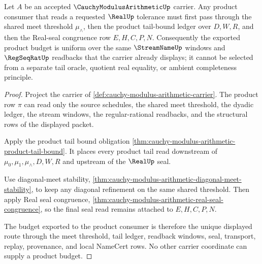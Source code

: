 \begin{theorem}
\label{thm:cauchy-modulus-arithmetic-uniform-product-budget}
Let $A$ be an accepted $\CauchyModulusArithmeticUp$ carrier. Any product
consumer that reads a requested $\RealUp$ tolerance must first pass through
the shared meet threshold $\mu_{\wedge}$, then the product tail-bound ledger
over $D,W,R$, and then the Real-seal congruence row $E,H,C,P,N$. Consequently
the exported product budget is uniform over the same $\StreamNameUp$ windows
and $\RegSeqRatUp$ readbacks that the carrier already displays; it cannot be
selected from a separate tail oracle, quotient real equality, or ambient
completeness principle.
\end{theorem}
\begin{proof}
Project the carrier of
\autoref{def:cauchy-modulus-arithmetic-carrier}. The product row $\pi$ can
read only the source schedules, the shared meet threshold, the dyadic ledger,
the stream windows, the regular-rational readbacks, and the structural rows
of the displayed packet.

Apply the product tail bound obligation
\autoref{thm:cauchy-modulus-arithmetic-product-tail-bound}. It places every
product tail read downstream of $\mu_0,\mu_1,\mu_{\wedge},D,W,R$ and upstream
of the $\RealUp$ seal.

Use diagonal-meet stability,
\autoref{thm:cauchy-modulus-arithmetic-diagonal-meet-stability}, to keep any
diagonal refinement on the same shared threshold. Then apply Real seal
congruence,
\autoref{thm:cauchy-modulus-arithmetic-real-seal-congruence}, so the final
seal read remains attached to $E,H,C,P,N$.

The budget exported to the product consumer is therefore the unique displayed
route through the meet threshold, tail ledger, readback windows, seal,
transport, replay, provenance, and local NameCert rows. No other carrier
coordinate can supply a product budget.
\end{proof}

